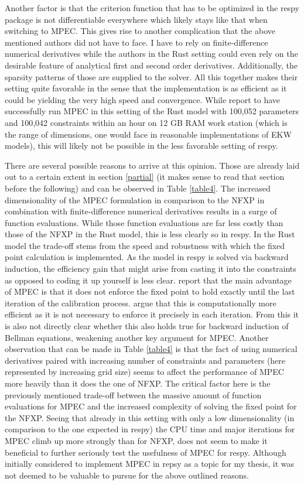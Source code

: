 Another factor is that the criterion function that has to be optimized in the respy package is not differentiable everywhere which likely stays like that when switching to MPEC. This gives rise to another complication that the above mentioned authors did not have to face. I have to rely on finite-difference numerical derivatives while the authors in the Rust setting could even rely on the desirable feature of analytical first and second order derivatives. Additionally, the sparsity patterns of those are supplied to the solver. All this together makes their setting quite favorable in the sense that the implementation is as efficient as it could be yielding the very high speed and convergence. While \cite{Su.Judd.2012} report to have successfully run MPEC in this setting of the Rust model with 100,052 parameters and 100,042 constraints within an hour on 12 GB RAM work station (which is the range of dimensions, one would face in reasonable implementations of EKW models), this will likely not be possible in the less favorable setting of respy.

There are several possible reasons to arrive at this opinion. Those are already laid out to a certain extent in section \ref{partial} (it makes sense to read that section before the following) and can be observed in Table \ref{table4}. The increased dimensionality of the MPEC formulation in comparison to the NFXP in combination with finite-difference numerical derivatives results in a surge of function evaluations. While those function evaluations are far less costly than those of the NFXP in the Rust model, this is less clearly so in respy. In the Rust model the trade-off stems from the speed and robustness with which the fixed point calculation is implemented. As the model in respy is solved via backward induction, the efficiency gain that might arise from casting it into the constraints as opposed to coding it up yourself is less clear. \cite{Su.Judd.2012} report that the main advantage of MPEC is that it does not enforce the fixed point to hold exactly until the last iteration of the calibration process. \cite{Aguirregabiria.2002} argue that this is computationally more efficient as it is not necessary to enforce it precisely in each iteration. From this it is also not directly clear whether this also holds true for backward induction of Bellman equations, weakening another key argument for MPEC. Another observation that can be made in Table \ref{table4} is that the fact of using numerical derivatives paired with increasing number of constraints and parameters (here represented by increasing grid size) seems to affect the performance of MPEC more heavily than it does the one of NFXP. The critical factor here is the previously mentioned trade-off between the massive amount of function evaluations for MPEC and the increased complexity of solving the fixed point for the NFXP. Seeing that already in this setting with only a low dimensionality (in comparison to the one expected in respy) the CPU time and major iterations for MPEC climb up more strongly than for NFXP, does not seem to make it beneficial to further seriously test the usefulness of MPEC for respy. Although initially considered to implement MPEC in repsy as a topic for my thesis, it was not deemed to be valuable to pursue for the above outlined reasons.

